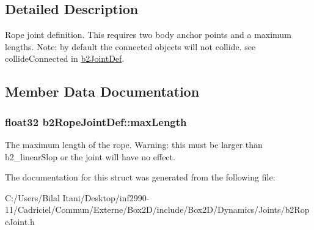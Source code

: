 \subsection{Detailed Description}
Rope joint definition. This requires two body anchor points and a maximum lengths. Note\+: by default the connected objects will not collide. see collide\+Connected in \hyperlink{structb2_joint_def}{b2\+Joint\+Def}. 

\subsection{Member Data Documentation}
\subsubsection[{\texorpdfstring{max\+Length}{maxLength}}]{\setlength{\rightskip}{0pt plus 5cm}float32 b2\+Rope\+Joint\+Def\+::max\+Length}\hypertarget{structb2_rope_joint_def_a6efdcae22e2bdcfc3aae62da1a5f0d69}{}\label{structb2_rope_joint_def_a6efdcae22e2bdcfc3aae62da1a5f0d69}
The maximum length of the rope. Warning\+: this must be larger than b2\+\_\+linear\+Slop or the joint will have no effect. 

The documentation for this struct was generated from the following file\+:\begin{DoxyCompactItemize}
\item 
C\+:/\+Users/\+Bilal Itani/\+Desktop/inf2990-\/11/\+Cadriciel/\+Commun/\+Externe/\+Box2\+D/include/\+Box2\+D/\+Dynamics/\+Joints/b2\+Rope\+Joint.\+h\end{DoxyCompactItemize}
